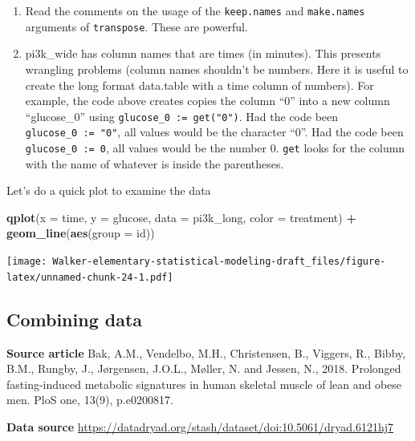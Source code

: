 \documentclass[]{book}
\newenvironment{Shaded}{\begin{snugshade}}{\end{snugshade}}
\newcommand{\DataTypeTok}[1]{\textcolor[rgb]{0.13,0.29,0.53}{#1}}
\newcommand{\KeywordTok}[1]{\textcolor[rgb]{0.13,0.29,0.53}{\textbf{#1}}}
\newcommand{\NormalTok}[1]{#1}
\newcommand{\OperatorTok}[1]{\textcolor[rgb]{0.81,0.36,0.00}{\textbf{#1}}}
\newcommand{\StringTok}[1]{\textcolor[rgb]{0.31,0.60,0.02}{#1}}
\providecommand{\tightlist}{%
  \setlength{\itemsep}{0pt}\setlength{\parskip}{0pt}}
\begin{document}
\begin{enumerate}
\def\labelenumi{\arabic{enumi}.}
\tightlist
\item
  Read the comments on the usage of the \texttt{keep.names} and \texttt{make.names} arguments of \texttt{transpose}. These are powerful.
\item
  pi3k\_wide has column names that are times (in minutes). This presents wrangling problems (column names shouldn't be numbers. Here it is useful to create the long format data.table with a time column of numbers). For example, the code above creates copies the column ``0'' into a new column ``glucose\_0'' using \texttt{glucose\_0\ :=\ get("0")}. Had the code been \texttt{glucose\_0\ :=\ "0"}, all values would be the character ``0''. Had the code been \texttt{glucose\_0\ :=\ 0}, all values would be the number 0. \texttt{get} looks for the column with the name of whatever is inside the parentheses.
\end{enumerate}

Let's do a quick plot to examine the data

\begin{Shaded}
\begin{Highlighting}[]
\KeywordTok{qplot}\NormalTok{(}\DataTypeTok{x =}\NormalTok{ time,}
      \DataTypeTok{y =}\NormalTok{ glucose,}
      \DataTypeTok{data =}\NormalTok{ pi3k_long,}
      \DataTypeTok{color =}\NormalTok{ treatment) }\OperatorTok{+}
\StringTok{  }\KeywordTok{geom_line}\NormalTok{(}\KeywordTok{aes}\NormalTok{(}\DataTypeTok{group =}\NormalTok{ id))}
\end{Highlighting}
\end{Shaded}

\texttt{[image: Walker-elementary-statistical-modeling-draft\_files/figure-latex/unnamed-chunk-24-1.pdf]}

\hypertarget{combining-data}{%
\subsection{Combining data}\label{combining-data}}

\textbf{Source article} Bak, A.M., Vendelbo, M.H., Christensen, B., Viggers, R., Bibby, B.M., Rungby, J., Jørgensen, J.O.L., Møller, N. and Jessen, N., 2018. Prolonged fasting-induced metabolic signatures in human skeletal muscle of lean and obese men. PloS one, 13(9), p.e0200817.

\textbf{Data source} \url{https://datadryad.org/stash/dataset/doi:10.5061/dryad.6121hj7}
\end{document}
